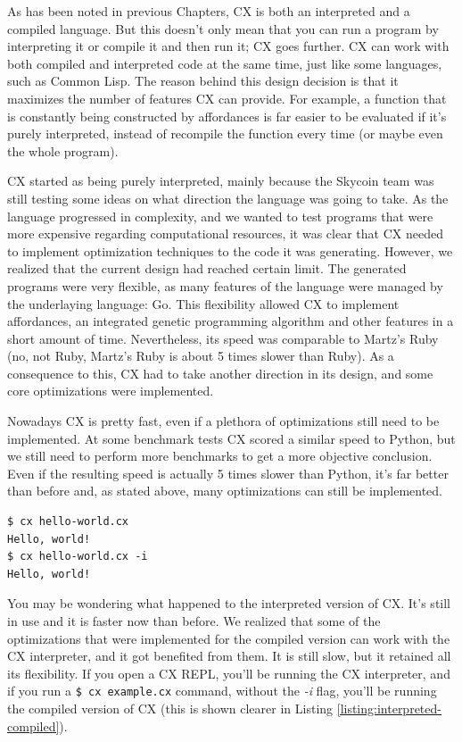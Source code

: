 \documentclass[11pt,fleqn,openany]{book} %
\begin{document}
As has been noted in previous Chapters, CX is both an interpreted and a compiled language. But this doesn't only mean that you can run a program by interpreting it or compile it and then run it; CX goes further. CX can work with both compiled and interpreted code at the same time, just like some languages, such as Common Lisp. The reason behind this design decision is that it maximizes the number of features CX can provide. For example, a function that is constantly being constructed by affordances is far easier to be evaluated if it's purely interpreted, instead of recompile the function every time (or maybe even the whole program).

CX started as being purely interpreted, mainly because the Skycoin team was still testing some ideas on what direction the language was going to take. As the language progressed in complexity, and we wanted to test programs that were more expensive regarding computational resources, it was clear that CX needed to implement optimization techniques to the code it was generating. However, we realized that the current design had reached certain limit. The generated programs were very flexible, as many features of the language were managed by the underlaying language: Go. This flexibility allowed CX to implement affordances, an integrated genetic programming algorithm and other features in a short amount of time. Nevertheless, its speed was comparable to Martz's Ruby (no, not Ruby, Martz's Ruby is about 5 times slower than Ruby). As a consequence to this, CX had to take another direction in its design, and some core optimizations were implemented.

Nowadays CX is pretty fast, even if a plethora of optimizations still  need to be implemented. At some benchmark tests CX scored a similar speed to Python, but we still need to perform more benchmarks to get a more objective conclusion. Even if the resulting speed is actually 5 times slower than Python, it's far better than before and, as stated above, many optimizations can still be implemented.

\begin{lstlisting}[caption={Interpreting and Compiling the same Program},captionpos=b,label={listing:interpreted-compiled}]
$ cx hello-world.cx
Hello, world!
$ cx hello-world.cx -i
Hello, world!
\end{lstlisting}

You may be wondering what happened to the interpreted version of CX. It's still in use and it is faster now than before. We realized that some of the optimizations that were implemented for the compiled version can work with the CX interpreter, and it got benefited from them. It is still slow, but it retained all its flexibility. If you open a CX REPL, you'll be running the CX interpreter, and if you run a \lstinline{$ cx example.cx} command, without the \emph{-i} flag, you'll be running the compiled version of CX (this is shown clearer in Listing \ref{listing:interpreted-compiled}).
\end{document}
